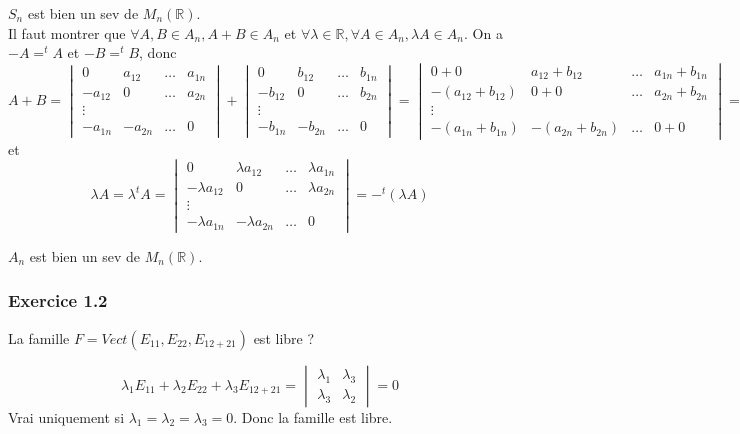 \documentclass[]{book}
\theoremstyle{definition}
\newcommand{\bb}[1]{\mathbb{#1}}
\newcommand{\R}{\bb{R}}
\begin{document}
$S_n$ est bien un sev de $M_n(\R)$.\\


Il faut montrer que $\forall A, B \in A_n, A + B \in A_n$ et $\forall \lambda \in \R, \forall A \in A_n, \lambda A \in A_n$. On a $-A = ^{t}A$ et $-B = ^{t}B$, donc
$$
A + B = \begin{vmatrix} 0 & a_{12} & \ldots & a_{1n} \\ -a_{12} & 0 & \ldots & a_{2n} \\ \vdots & & & \\ -a_{1n} & -a_{2n} & \ldots & 0 \end{vmatrix} +
\begin{vmatrix} 0 & b_{12} & \ldots & b_{1n} \\ -b_{12} & 0 & \ldots & b_{2n} \\ \vdots & & & \\ -b_{1n} & -b_{2n} & \ldots & 0 \end{vmatrix} =
\begin{vmatrix} 0 + 0 & a_{12} + b_{12} & \ldots & a_{1n} + b_{1n} \\ -(a_{12} + b_{12}) & 0 + 0 & \ldots & a_{2n} + b_{2n} \\ \vdots & & & \\ -(a_{1n} + b_{1n})& -(a_{2n} + b_{2n})& \ldots & 0 + 0 \end{vmatrix}
= -^{t}(A+B)
$$ 
et
$$
\lambda A = \lambda ^{t}A = \begin{vmatrix} 0 & \lambda a_{12} & \ldots & \lambda a_{1n} \\ -\lambda a_{12} & 0 & \ldots & \lambda a_{2n} \\ \vdots & & & \\ -\lambda a_{1n} & -\lambda a_{2n} & \ldots & 0 \end{vmatrix} = -^{t}(\lambda A)
$$

$A_n$ est bien un sev de $M_n(\R)$.

\subsubsection*{Exercice 1.2}
La famille $F = Vect(E_{11},E_{22},E_{12+21})$ est libre ?
	
$$
\lambda_1 E_{11} + \lambda_2 E_{22} + \lambda_3 E_{12+21} = \begin{vmatrix} \lambda_1 & \lambda_3 \\ \lambda_3  & \lambda_2 \end{vmatrix} = 0
$$
Vrai uniquement si $\lambda_1 = \lambda_2 = \lambda_3  = 0$. Donc la famille est libre.\\
\end{document}
